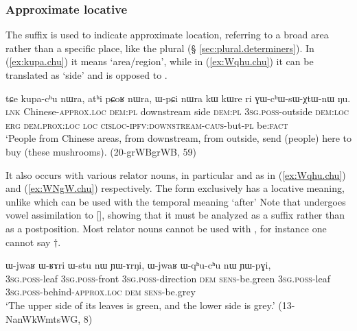 \subsubsection{Approximate locative} \label{sec:approximate.locative}
The suffix  is used to indicate approximate location, referring to a broad area rather than a specific place, like the plural  (§ \ref{sec:plural.determiners}). In (\ref{ex:kupa.chu}) it means `area/region', while in (\ref{ex:Wqhu.chu}) it can be translated as `side' and is opposed to .
 
 \begin{exe}
\ex \label{ex:kupa.chu}
 \gll  tɕe kupa-cʰu nɯra, atʰi pɕoʁ nɯra, ɯ-pɕi nɯra kɯ kɯre ri ɣɯ-cʰɯ-sɯ-χtɯ-nɯ ŋu.  \\
 \textsc{lnk} Chinese-\textsc{approx}.\textsc{loc} \textsc{dem}:\textsc{pl}  downstream side \textsc{dem}:\textsc{pl} \textsc{3sg}.\textsc{poss}-outside \textsc{dem}:\textsc{loc} \textsc{erg} \textsc{dem}.\textsc{prox}:\textsc{loc} \textsc{loc} \textsc{cisloc}-\textsc{ipfv}:\textsc{downstream}-\textsc{caus}-but-\textsc{pl} be:\textsc{fact} \\
 \glt `People from Chinese areas, from downstream, from outside, send (people) here to buy (these mushrooms). (20-grWBgrWB, 59)
 \end{exe}
 
 It also occurs with various relator nouns, in particular  and  as in (\ref{ex:Wqhu.chu}) and (\ref{ex:WNgW.chu}) respectively. The form exclusively has a locative meaning, unlike  which can be used with the temporal meaning `after' Note that  undergoes vowel assimilation to [], showing that it must be analyzed as a suffix rather than as a postposition. Most relator nouns cannot be used with , for instance one cannot say $\dagger$.

 
  \begin{exe}
\ex \label{ex:Wqhu.chu}
 \gll  ɯ-jwaʁ ɯ-ʁɤri ɯ-stu nɯ ɲɯ-ɤrŋi, ɯ-jwaʁ ɯ-qʰu-cʰu nɯ ɲɯ-pɣi, \\
 \textsc{3sg}.\textsc{poss}-leaf  \textsc{3sg}.\textsc{poss}-front \textsc{3sg}.\textsc{poss}-direction \textsc{dem} \textsc{sens}-be.green   \textsc{3sg}.\textsc{poss}-leaf  \textsc{3sg}.\textsc{poss}-behind-\textsc{approx}.\textsc{loc} \textsc{dem} \textsc{sens}-be.grey \\
 \glt  `The upper side of its leaves is green, and the lower side is grey.' (13-NanWkWmtsWG, 8)
  \end{exe}
  
